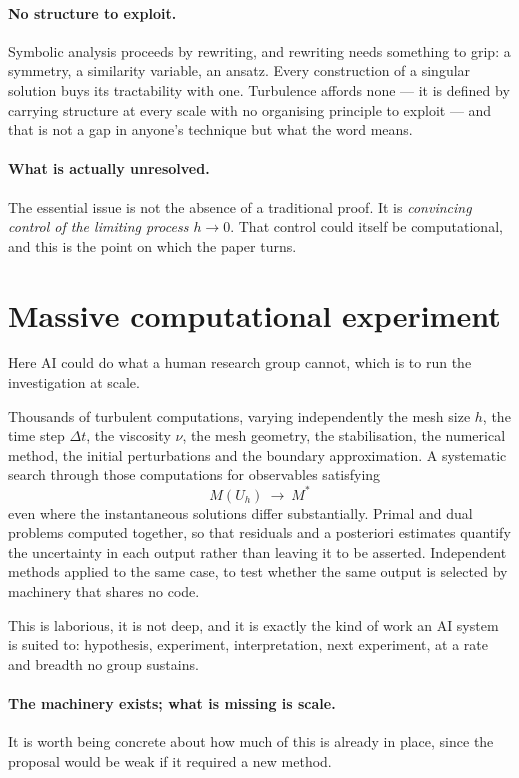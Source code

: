 \documentclass[11pt]{article}
\begin{document}
\paragraph{No structure to exploit.} Symbolic analysis proceeds by rewriting, and rewriting needs
something to grip: a symmetry, a similarity variable, an ansatz. Every construction of a singular
solution buys its tractability with one. Turbulence affords none --- it is defined by carrying
structure at every scale with no organising principle to exploit --- and that is not a gap in
anyone's technique but what the word means.

\paragraph{What is actually unresolved.} The essential issue is not the absence of a traditional
proof. It is \emph{convincing control of the limiting process $h\rightarrow0$}. That control could
itself be computational, and this is the point on which the paper turns.

\section{Massive computational experiment}\label{sec:experiment}

Here AI could do what a human research group cannot, which is to run the investigation at scale.

Thousands of turbulent computations, varying independently the mesh size $h$, the time step $\Delta
t$, the viscosity $\nu$, the mesh geometry, the stabilisation, the numerical method, the initial
perturbations and the boundary approximation. A systematic search through those computations for
observables satisfying
\[
M(U_h)\ \longrightarrow\ M^*
\]
even where the instantaneous solutions differ substantially. Primal and dual problems computed
together, so that residuals and a posteriori estimates quantify the uncertainty in each output
rather than leaving it to be asserted. Independent methods applied to the same case, to test whether
the same output is selected by machinery that shares no code.

This is laborious, it is not deep, and it is exactly the kind of work an AI system is suited to:
hypothesis, experiment, interpretation, next experiment, at a rate and breadth no group sustains.

\paragraph{The machinery exists; what is missing is scale.} It is worth being concrete about how much
of this is already in place, since the proposal would be weak if it required a new method.
\end{document}
